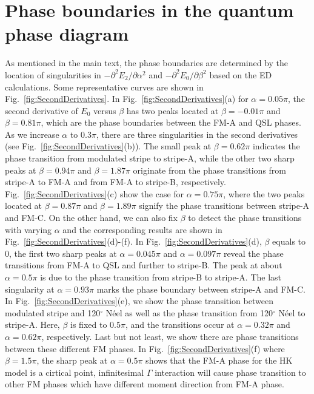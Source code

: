 \documentclass[aps,prb,reprint,amsfonts,amsmath,amssymb,showpacs,groupedaddress,superscriptaddress]{revtex4-1}
\begin{document}

\appendix

\section{\label{apx:PhaseBoundary}Phase boundaries in the quantum phase diagram}

As mentioned in the main text, the phase boundaries are determined by the location of singularities in $-\partial^{2} E_{2} / \partial \alpha^{2}$ and $-\partial^{2} E_{0} / \partial \beta^{2}$ based on the ED calculations. Some representative curves are shown in Fig.~\ref{fig:SecondDerivatives}. In Fig.~\ref{fig:SecondDerivatives}(a) for $\alpha=0.05\pi$, the second derivative of $E_0$ versus $\beta$ has two peaks located at $\beta=-0.01\pi$ and $\beta=0.81\pi$, which are the phase boundaries between the FM-A and QSL phases. As we increase $\alpha$ to $0.3\pi$, there are three singularities in the second derivatives (see Fig.~\ref{fig:SecondDerivatives}(b)). The small peak at $\beta=0.62\pi$ indicates the phase transition from modulated stripe to stripe-A, while the other two sharp peaks at $\beta=0.94\pi$ and $\beta=1.87\pi$ originate from the phase transitions from stripe-A to FM-A and from FM-A to stripe-B, respectively. Fig.~\ref{fig:SecondDerivatives}(c) show the case for $\alpha=0.75\pi$, where the two peaks located at $\beta=0.87\pi$ and $\beta=1.89\pi$ signify the phase transitions between stripe-A and FM-C. On the other hand, we can also fix $\beta$ to detect the phase transitions with varying $\alpha$ and the corresponding results are shown in Fig.~\ref{fig:SecondDerivatives}(d)-(f). In Fig.~\ref{fig:SecondDerivatives}(d), $\beta$ equals to $0$, the first two sharp peaks at $\alpha=0.045\pi$ and $\alpha=0.097\pi$ reveal the phase transitions from FM-A to QSL and further to stripe-B. The peak at about $\alpha=0.5\pi$ is due to the phase transition from stripe-B to stripe-A. The last singularity at $\alpha=0.93\pi$ marks the phase boundary between stripe-A and FM-C. In Fig.~\ref{fig:SecondDerivatives}(e), we show the phase transition between modulated stripe and 120$^\circ$ N\'{e}el as well as the phase transition from 120$^\circ$ N\'{e}el to stripe-A. Here, $\beta$ is fixed to $0.5\pi$, and the transitions occur at $\alpha=0.32\pi$ and $\alpha=0.62\pi$, respectively. Last but not least, we show there are phase transitions between these different FM phases. In Fig.~\ref{fig:SecondDerivatives}(f) where $\beta=1.5\pi$, the sharp peak at $\alpha=0.5\pi$ shows that the FM-A phase for the HK model is a cirtical point, infinitesimal $\Gamma$ interaction will cause phase transition to other FM phases which have different moment direction from FM-A phase.
\end{document}
